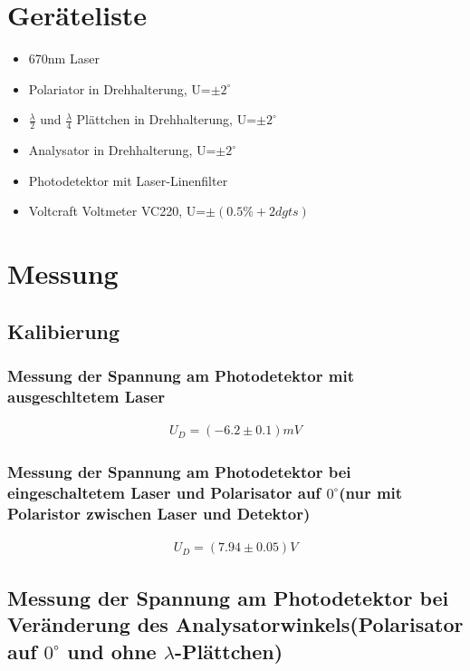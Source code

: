 \documentclass[a4paper]{article}
\begin{document}
\section{Geräteliste}
\begin{itemize}
  \item 670nm Laser
  \item Polariator in Drehhalterung, U=$\pm 2^\circ$
  \item $\frac{\lambda}{2}$ und $\frac{\lambda}{4}$ Plättchen in Drehhalterung, U=$\pm 2^\circ$
  \item Analysator in Drehhalterung, U=$\pm 2^\circ$
  \item Photodetektor mit Laser-Linenfilter
  \item Voltcraft Voltmeter VC220, U=$\pm(0.5\% + 2 dgts)$
\end{itemize}

\section{Messung}
\subsection{Kalibierung}
  \subsubsection{Messung der Spannung am Photodetektor mit ausgeschltetem Laser}
  \begin{align}
    U_D=(-6.2 \pm 0.1)mV
  \end{align}
  
  \subsubsection{Messung der Spannung am Photodetektor bei eingeschaltetem Laser und Polarisator auf $0^\circ$(nur mit Polaristor zwischen Laser und Detektor)}
  \begin{align}
    U_D=(7.94 \pm 0.05)V
  \end{align}
\newpage
\subsection{Messung der Spannung am Photodetektor bei Veränderung des Analysatorwinkels(Polarisator auf $0^\circ$ und ohne $\lambda$-Plättchen)}
\end{document}
